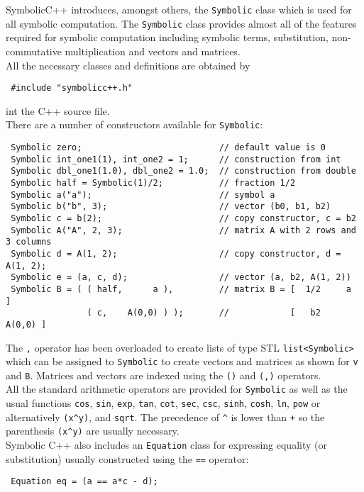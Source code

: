 \documentclass[12pt,a4paper]{report}
\begin{document}
SymbolicC++ introduces, amongst others, the \verb|Symbolic| class
which is used for all symbolic computation. The \verb|Symbolic|
class provides almost all of the features required for symbolic computation
including symbolic terms, substitution, non-commutative multiplication
and vectors and matrices.\\

All the necessary classes and definitions are obtained by
\begin{verbatim}
 #include "symbolicc++.h"
\end{verbatim}
int the C++ source file.\\

There are a number of constructors available for \verb|Symbolic|:
\begin{verbatim}
 Symbolic zero;                           // default value is 0
 Symbolic int_one1(1), int_one2 = 1;      // construction from int
 Symbolic dbl_one1(1.0), dbl_one2 = 1.0;  // construction from double
 Symbolic half = Symbolic(1)/2;           // fraction 1/2
 Symbolic a("a");                         // symbol a
 Symbolic b("b", 3);                      // vector (b0, b1, b2)
 Symbolic c = b(2);                       // copy constructor, c = b2
 Symbolic A("A", 2, 3);                   // matrix A with 2 rows and 3 columns
 Symbolic d = A(1, 2);                    // copy constructor, d = A(1, 2);
 Symbolic e = (a, c, d);                  // vector (a, b2, A(1, 2))
 Symbolic B = ( ( half,      a ),         // matrix B = [  1/2     a    ]
                ( c,    A(0,0) ) );       //            [   b2   A(0,0) ]
\end{verbatim}

The \verb|,| operator has been overloaded to create lists of type STL 
\verb|list<Symbolic>| which can be assigned to \verb|Symbolic| to create
vectors and matrices as shown for \verb|v| and \verb|B|. Matrices
and vectors are indexed using the \verb|()| and \verb|(,)| operators.\\

All the standard arithmetic operators are provided for \verb|Symbolic|
as well as the usual functions \verb|cos|, \verb|sin|, \verb|exp|,
\verb|tan|, \verb|cot|, \verb|sec|, \verb|csc|, \verb|sinh|, \verb|cosh|,
\verb|ln|, \verb|pow| or alternatively \verb|(x^y)|, and \verb|sqrt|.
The precedence of \verb|^| is lower than \verb |+| so the parenthesis
\verb|(x^y)| are usually necessary.\\

Symbolic C++ also includes an \verb|Equation| class for expressing
equality (or substitution) usually constructed using the \verb|==| operator:
\begin{verbatim}
 Equation eq = (a == a*c - d);
\end{verbatim}
\end{document}

